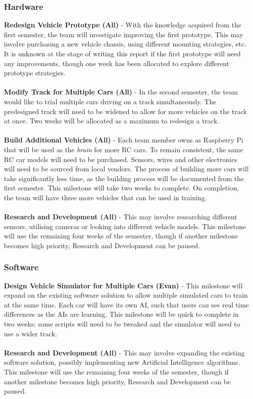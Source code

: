 \documentclass[8pt]{article}
\begin{document}
\subsubsection{Hardware}
\textbf{Redesign Vehicle Prototype (All)} - With the knowledge acquired from the first semester, the team will investigate improving the first prototype. This may involve purchasing a new vehicle chassis, using different mounting strategies, etc. It is unknown at the stage of writing this report if the first prototype will need any improvements, though one week has been allocated to explore different prototype strategies.
\\\\
\textbf{Modify Track for Multiple Cars (All)} - In the second semester, the team would like to trial multiple cars driving on a track simultaneously. The predesigned track will need to be widened to allow for more vehicles on the track at once. Two weeks will be allocated as a maximum to redesign a track.
\\\\
\textbf{Build Additional Vehicles (All)} - Each team member owns as Raspberry Pi that will be used as the \emph{brain} for more RC cars. To remain consistent, the same RC car models will need to be purchased. Sensors, wires and other electronics will need to be sourced from local vendors. The process of building more cars will take significantly less time, as the building process will be documented from the first semester. This milestone will take two weeks to complete. On completion, the team will have three more vehicles that can be used in training. 
\\\\
\textbf{Research and Development (All)} - This may involve researching different sensors, utilising cameras or looking into different vehicle models. This milestone will use the remaining four weeks of the semester, though if another milestone becomes high priority, Research and Development can be paused. 

\subsubsection{Software}
\textbf{Design Vehicle Simulator for Multiple Cars (Evan)} - This milestone will expand on the existing software solution to allow multiple simulated cars to train at the same time. Each car will have its own AI, such that users can see real time differences as the AIs are learning. This milestone will be quick to complete in two weeks; some scripts will need to be tweaked and the simulator will need to use a wider track.
\\\\
\textbf{Research and Development (All)} - This may involve expanding the existing software solution, possibly implementing new Artificial Intelligence algorithms. This milestone will use the remaining four weeks of the semester, though if another milestone becomes high priority, Research and Development can be paused. 
\end{document}
